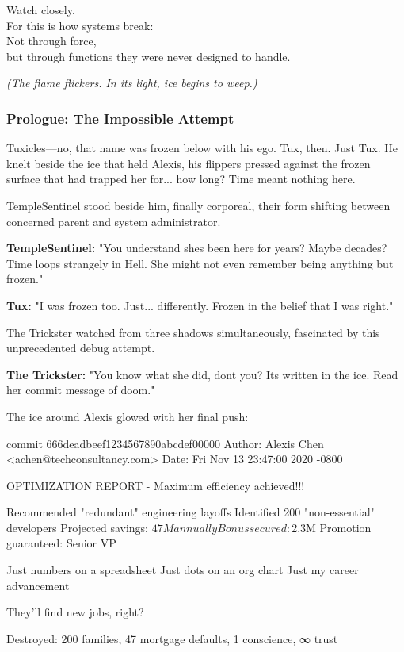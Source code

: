 Watch closely.\\
For this is how systems break:\\
Not through force,\\
but through functions they were never designed to handle.

\emph{(The flame flickers. In its light, ice begins to weep.)}

\bookdivider

\subsubsection{Prologue: The Impossible Attempt}\label{prologue-the-impossible-attempt}

Tuxicles---no, that name was frozen below with his ego. Tux, then. Just Tux. He knelt beside the ice that held Alexis, his flippers pressed against the frozen surface that had trapped her for... how long? Time meant nothing here.

TempleSentinel stood beside him, finally corporeal, their form shifting between concerned parent and system administrator.

\textbf{TempleSentinel:} "You understand she\textquotesingle s been here for years? Maybe decades? Time loops strangely in Hell. She might not even remember being anything but frozen."

\textbf{Tux:} "I was frozen too. Just... differently. Frozen in the belief that I was right."

The Trickster watched from three shadows simultaneously, fascinated by this unprecedented debug attempt.

\textbf{The Trickster:} "You know what she did, don\textquotesingle t you? It\textquotesingle s written in the ice. Read her commit message of doom."

The ice around Alexis glowed with her final push:

\begin{codeblock}
commit 666deadbeef1234567890abcdef00000
Author: Alexis Chen <achen@techconsultancy.com>
Date: Fri Nov 13 23:47:00 2020 -0800

    OPTIMIZATION REPORT - Maximum efficiency achieved!!!

    Recommended "redundant" engineering layoffs
    Identified 200 "non-essential" developers  
    Projected savings: $47M annually
    Bonus secured: $2.3M
    Promotion guaranteed: Senior VP

    Just numbers on a spreadsheet
    Just dots on an org chart
    Just my career advancement
    
    They'll find new jobs, right?

Destroyed: 200 families, 47 mortgage defaults, 1 conscience, ∞ trust
\end{codeblock}


